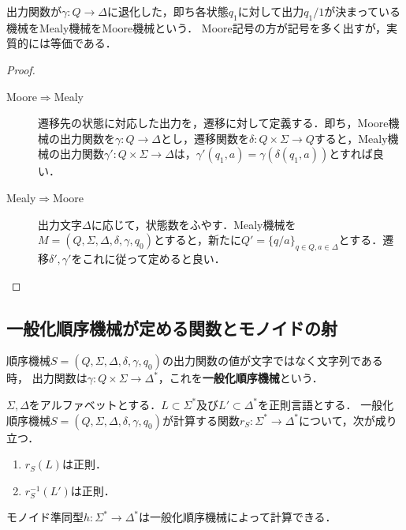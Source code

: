 \begin{proposition}[Moore機械とMealy機械の等価性]
    出力関数が$\gamma:Q\to\Delta$に退化した，即ち各状態$q_1$に対して出力$q_1/1$が決まっている機械をMealy機械をMoore機械という．
    Moore記号の方が記号を多く出すが，実質的には等価である．
\end{proposition}
\begin{proof}\mbox{}
    \begin{description}
        \item[Moore$\Rightarrow$Mealy] 遷移先の状態に対応した出力を，遷移に対して定義する．即ち，Moore機械の出力関数を$\gamma:Q\to\Delta$とし，遷移関数を$\delta:Q\times\Sigma\to Q$すると，Mealy機械の出力関数$\gamma':Q\times\Sigma\to\Delta$は，$\gamma'(q_1,a)=\gamma(\delta(q_1,a))$とすれば良い．
        \item[Mealy$\Rightarrow$Moore] 出力文字$\Delta$に応じて，状態数をふやす．Mealy機械を$M=(Q,\Sigma,\Delta,\delta,\gamma,q_0)$とすると，新たに$Q'=\{q/a\}_{q\in Q,a\in\Delta}$とする．遷移$\delta',\gamma'$をこれに従って定めると良い．
    \end{description}
\end{proof}

\subsection{一般化順序機械が定める関数とモノイドの射}

\begin{definition}
    順序機械$S=(Q,\Sigma,\Delta,\delta,\gamma,q_0)$の出力関数の値が文字ではなく文字列である時，
    出力関数は$\gamma:Q\times\Sigma\to\Delta^*$，これを\textbf{一般化順序機械}という．
\end{definition}

\begin{theorem}[一般化順序機械が計算する関数は正則構造を保つ]
    $\Sigma,\Delta$をアルファベットとする．$L\subset\Sigma^*$及び$L'\subset\Delta^*$を正則言語とする．
    一般化順序機械$S=(Q,\Sigma,\Delta,\delta,\gamma,q_0)$が計算する関数$r_S:\Sigma^*\to\Delta^*$について，次が成り立つ．
    \begin{enumerate}
        \item $r_S(L)$は正則．
        \item $r_S^{-1}(L')$は正則．
    \end{enumerate}
\end{theorem}

\begin{proposition}
    モノイド準同型$h:\Sigma^*\to\Delta^*$は一般化順序機械によって計算できる．
\end{proposition}

